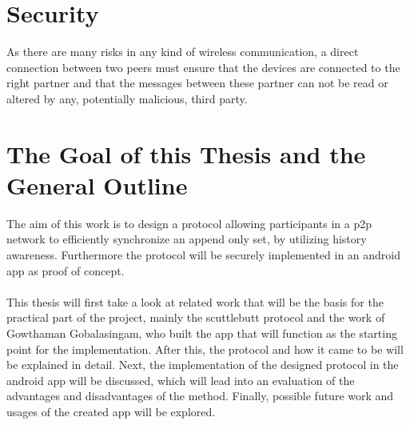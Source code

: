 \section{Security}

As there are many risks in any kind of wireless communication, a direct connection between two peers must ensure that the devices are connected to the right partner and that the messages between these partner can not be read or altered by any, potentially malicious, third party.

\section{The Goal of this Thesis and the General Outline}

The aim of this work is to design a protocol allowing participants in a p2p network to efficiently synchronize an append only set, by utilizing history awareness. Furthermore the protocol will be securely implemented in an android app as proof of concept.
\\
\\
This thesis will first take a look at related work that will be the basis for the practical part of the project, mainly the scuttlebutt protocol and the work of Gowthaman Gobalasingam, who built the app that will function as the starting point for the implementation. After this, the protocol and how it came to be will be explained in detail. Next, the implementation of the designed protocol in the android app will be discussed, which will lead into an evaluation of the advantages and disadvantages of the method. Finally, possible future work and usages of the created app will be explored. 
